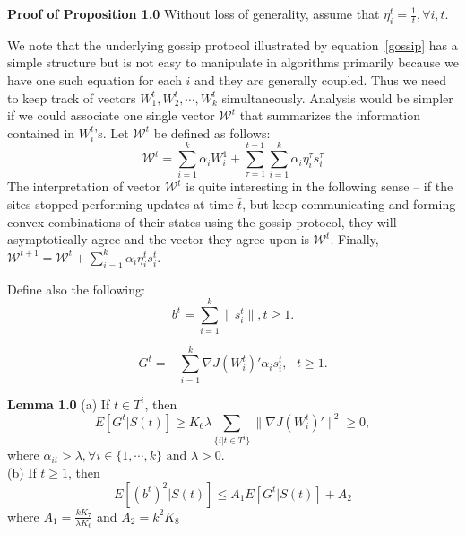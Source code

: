 \noindent \textbf{Proof of Proposition 1.0}
Without loss of generality, assume that $\eta_i^{t} = \frac{1}{t}, \forall i, t$. 

We note that the underlying gossip protocol illustrated by equation~\ref{gossip} has a simple structure but is not easy to manipulate in algorithms primarily because we have one such equation for each $i$ and they are generally coupled. Thus we need to keep track of vectors $W_1^t, W_2^t, \cdots, W_k^t$ simultaneously. Analysis would be simpler if we could associate one single vector $\mathcal{W}^t$ that summarizes the information contained in $W_i^t$'s. Let $\mathcal{W}^t$ be defined as follows:
\begin{equation}
\label{avgGos}
\mathcal{W}^t = \sum_{i=1}^k \alpha_{i} W_i^1 + \sum_{\tau=1}^{t-1} \sum_{i=1}^{k} \alpha_{i} \eta_i^{\tau} s_i^{\tau}
\end{equation}
The interpretation of vector $\mathcal{W}^t$ is quite interesting in the following sense -- if the sites stopped performing updates at time $\bar{t}$, but keep communicating and forming convex combinations of their states using the gossip protocol, they will asymptotically agree and the vector they agree upon is $\mathcal{W}^t$. Finally, $\mathcal{W}^{t+1}=\mathcal{W}^t + \sum_{i=1}^k \alpha_{i} \eta_i^{t} s_i^{t}$.

Define also the following:
\begin{equation}
\label{bee}
b^t = \sum_{i=1}^k \parallel s_i^{t} \parallel, t \ge 1.
\end{equation}

\begin{equation}
G^t = - \sum_{i=1}^k \nabla J(W_i^t)' \alpha_{i} s_i^{t}, \text{ } t \ge 1.
\end{equation}


\noindent \textbf{Lemma 1.0}
(a) If $t \in T^i$, then 
\begin{equation}
E[ G^t | S(t)] \ge K_6 \lambda \sum_{\{i|t \in T^i\}} \parallel \nabla J(W_i^{t})' \parallel^2 \ge 0,
\end{equation}
where $\alpha_{ii}>\lambda, \forall i \in \{1,\cdots,k\} \text{ and }\lambda > 0$. \\ 
(b) If $t \ge 1$, then 
\begin{equation}
\label{boundbt}
E[(b^t)^2 |  S(t)] \le A_1 E[ G^t | S(t)] + A_2 
\end{equation}
where $A_1=\frac{k K_7}{\lambda K_6}$ and $A_2=k^2 K_8$

